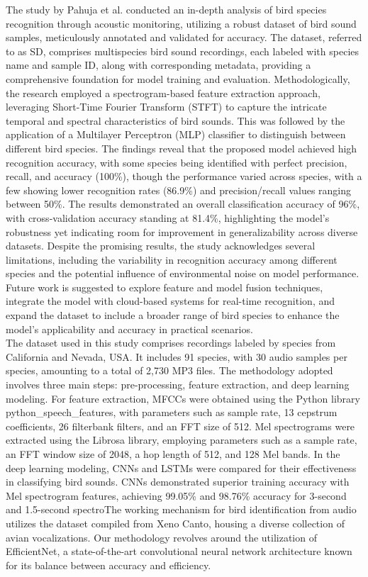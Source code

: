 The study\cite{pahuja2021sound} by Pahuja et al. conducted an in-depth analysis of bird species recognition through
acoustic monitoring, utilizing a robust dataset of bird sound samples,
meticulously annotated and validated for accuracy. The dataset, referred to as
SD, comprises multispecies bird sound recordings, each labeled with species
name and sample ID, along with corresponding metadata, providing a
comprehensive foundation for model training and evaluation. Methodologically,
the research employed a spectrogram-based feature extraction approach,
leveraging Short-Time Fourier Transform (STFT) to capture the intricate
temporal and spectral characteristics of bird sounds. This was followed by the
application of a Multilayer Perceptron (MLP) classifier to distinguish between
different bird species. The findings reveal that the proposed model achieved
high recognition accuracy, with some species being identified with perfect
precision, recall, and accuracy (100\%), though the performance varied across
species, with a few showing lower recognition rates (86.9\%) and
precision/recall values ranging between 50\%. The results demonstrated an
overall classification accuracy of 96\%, with cross-validation accuracy
standing at 81.4\%, highlighting the model's robustness yet indicating room for
improvement in generalizability across diverse datasets. Despite the promising
results, the study acknowledges several limitations, including the variability
in recognition accuracy among different species and the potential influence of
environmental noise on model performance. Future work is suggested to explore
feature and model fusion techniques, integrate the model with cloud-based
systems for real-time recognition, and expand the dataset to include a broader
range of bird species to enhance the model's applicability and accuracy in
practical scenarios.\\ 

The dataset used in this study\cite{carvalho2023automatic} comprises recordings labeled by species from California 
and Nevada, USA. It includes 91 species, with 30 audio samples per species, amounting 
to a total of 2,730 MP3 files. The methodology adopted involves three main steps: 
pre-processing, feature extraction, and deep learning modeling.
For feature extraction, MFCCs were obtained using the Python library python\_speech\_features, 
with parameters such as sample rate, 13 cepstrum coefficients, 26 filterbank filters, and an 
FFT size of 512. Mel spectrograms were extracted using the Librosa library, employing parameters 
such as a sample rate, an FFT window size of 2048, a hop length of 512, and 128 Mel bands.
In the deep learning modeling, CNNs and LSTMs were compared for their effectiveness in 
classifying bird sounds. CNNs demonstrated superior training accuracy with Mel spectrogram 
features, achieving 99.05\% and 98.76\% accuracy for 3-second and 1.5-second spectroThe working mechanism for bird identification from audio utilizes the dataset compiled from Xeno Canto, housing a diverse collection of avian vocalizations. 
Our methodology revolves around the utilization of EfficientNet, a state-of-the-art convolutional neural network architecture known for 
its balance between accuracy and efficiency.

